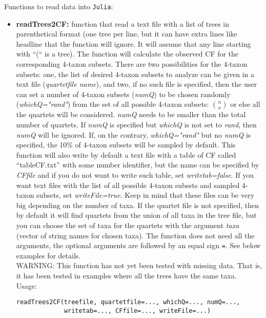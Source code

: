 \documentclass[12pt]{article}
\begin{document}
\noindent Functions to read data into \texttt{Julia}:
\begin{itemize}
\item \textbf{readTrees2CF:} function that read a text file with a
  list of trees in parenthetical format (one tree per line, but it can
  have extra lines like headline that the function will ignore. It
  will assume that any line starting with ``(`` is a tree). The
  function will calculate the observed CF for the corresponding
  4-taxon subsets. There are two possibilities for the 4-taxon subsets: one, the
  list of desired 4-taxon subsets to analyze can be given in a text file
  (\textit{quartetfile name}), and two, if no such file is specified,
  then the user can set a number of 4-taxon subsets (\textit{numQ}) to
  be chosen randomly (\textit{whichQ="rand"})
  from the set of all possible 4-taxon subsets: $n \choose x$ or else all the
  quartets will be considered. \textit{numQ} needs to be
  smaller than the total number of quartets. If \textit{numQ} is
  specified but \textit{whichQ} is not set to \textit{rand}, then
  \textit{numQ} will be ignored. If, on the contrary,
  \textit{whichQ="rand"} but no \textit{numQ} is specified, the 10\%
  of 4-taxon subsets will be sampled by default.
  This function will also write by default a text file
  with a table of CF called ``tableCF.txt'' with some number identifier, but the name can be
  specified by \textit{CFfile} and if you do not want to write such table,
  set \textit{writetab=false}. If you want text files with the list of
  all possible 4-taxon subsets and sampled 4-taxon subsets, set
  \textit{writeFile=true}. Keep in mind that these files can be very
  big depending on the number of taxa. If the quartet file is not specified, then by
  default it will find quartets from the union of all taxa in the tree
  file, but you can choose the set of taxa for the quartets with the
  argument \textit{taxa} (vector of string names for chosen taxa).  The function does not need all the
  arguments, the optional arguments are followed by an equal sign \texttt{=}.
  See below examples for details.
  \\

  WARNING: This function has not yet been tested with missing
  data. That is, it has been tested in
  examples where all the trees have the same taxa.\\
  Usage:
\begin{lstlisting}
readTrees2CF(treefile, quartetfile=..., whichQ=..., numQ=...,
             writetab=..., CFfile=..., writeFile=...)
\end{lstlisting}


\end{itemize}
\end{document}
